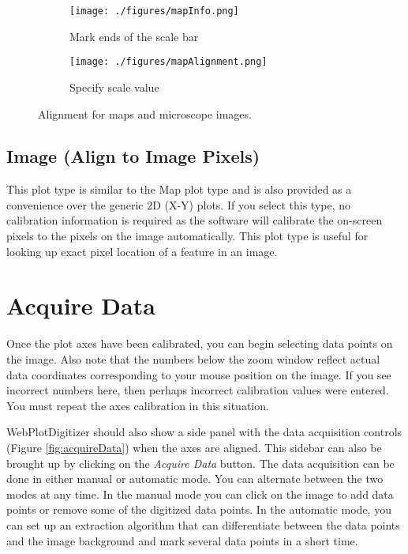 \documentclass[letterpaper, 10pt]{article}
\begin{document}
\begin{figure}
\centering
{\begin{subfigure}[b]{0.3\textwidth}
\texttt{[image: ./figures/mapInfo.png]}
\caption{Mark ends of the scale bar}
\end{subfigure}
\begin{subfigure}[b]{0.3\textwidth}
\texttt{[image: ./figures/mapAlignment.png]}
\caption{Specify scale value}
\end{subfigure}}
\caption{Alignment for maps and microscope images.}
\label{fig:mapAlignment}
\end{figure}

\subsection{Image (Align to Image Pixels)}
This plot type is similar to the Map plot type and is also provided as a convenience over the generic 2D (X-Y) plots. If you select this type, no calibration information is required as the software will calibrate the on-screen pixels to the pixels on the image automatically. This plot type is useful for looking up exact pixel location of a feature in an image.

\section{Acquire Data}

Once the plot axes have been calibrated, you can begin selecting data points on the image. Also note that the numbers below the zoom window reflect actual data coordinates corresponding to your mouse position on the image. If you see incorrect numbers here, then perhaps incorrect calibration values were entered. You must repeat the axes calibration in this situation. 

WebPlotDigitizer should also show a side panel with the data acquisition controls (Figure \ref{fig:acquireData}) when the axes are aligned. This sidebar can also be brought up by clicking on the \emph{Acquire Data} button. The data acquisition can be done in either manual or automatic mode. You can alternate between the two modes at any time. In the manual mode you can click on the image to add data points or remove some of the digitized data points. In the automatic mode, you can set up an extraction algorithm that can differentiate between the data points and the image background and mark several data points in a short time.
\end{document}
